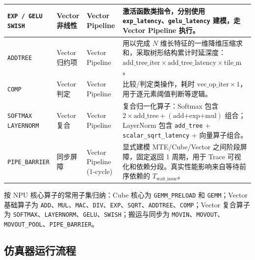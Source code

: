 \documentclass{CjC}
\begin{document}
\begin{table}[H]
\begin{tabular}{p{2.6cm} p{2.0cm} p{3.2cm} p{6.2cm}}
            \midrule \texttt{EXP / GELU} \newline \texttt{SWISH}  & Vector 非线性    & Vector Pipeline           & 激活函数类指令，分别使用 \texttt{exp\_latency}、\texttt{gelu\_latency} 建模，走 Vector Pipeline 执行。                                                               \\
            \midrule \texttt{ADDTREE}                             & Vector 归约项    & Vector Pipeline           & 用以完成 $N$ 维长特征的一维降维压缩求和，采取树形结构累计时延深度：$\text{add\_tree\_iter}\times \text{add\_tree\_latency}\times \text{tile\_m}$。                               \\
            \midrule \texttt{COMP}                                & Vector 判定     & Vector Pipeline           & 比较/判定类操作，耗时 $\text{vec\_op\_iter}\times 1$，用于逐元素阈值判断等逻辑。                                                                                         \\
            \midrule \texttt{SOFTMAX} \newline \texttt{LAYERNORM} & Vector 复合     & Vector Pipeline           & 复合归一化算子：Softmax 包含 $2\times\text{add\_tree}+ (\text{add+exp+mul})$ 组合；LayerNorm 包含 \texttt{add\_tree} + \texttt{scalar\_sqrt\_latency} + 向量算子组合。 \\
            \midrule \texttt{PIPE\_BARRIER}                       & 同步屏障          & Vector Pipeline (1-cycle) & 显式建模 MTE/Cube/Vector 之间阶段屏障，固定返回 1 周期，用于 Trace 可视化和依赖分段。真实性能影响来自等待前序依赖的 $T_{\text{wait\_issue}}$。                                                \\
            \bottomrule
        \end{tabular}
    \end{table}

    按 NPU 核心算子的常用子集归纳：Cube 核心为 \texttt{GEMM\_PRELOAD} 和 \texttt{GEMM}；Vector
    基础算子为 \texttt{ADD}、\texttt{MUL}、\texttt{MAC}、\texttt{DIV}、\texttt{EXP}、\texttt{SQRT}、\texttt{ADDTREE}、\texttt{COMP}；Vector
    复合算子为 \texttt{SOFTMAX}、\texttt{LAYERNORM}、\texttt{GELU}、\texttt{SWISH}；搬运与同步为
    \texttt{MOVIN}、\texttt{MOVOUT}、\texttt{MOVOUT\_POOL}、\texttt{PIPE\_BARRIER}。

    \subsection{仿真器运行流程}
\end{document}
